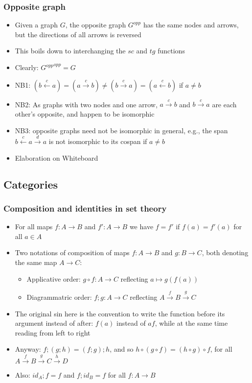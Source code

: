 \documentclass[handout]{beamer}
\begin{document}
\frame
  {   
    \frametitle{Opposite graph}\label{Ch2:oppgraph}

 \begin{itemize}[<+->]
\item Given a graph $G$, the opposite graph $G^{opp}$ has the same nodes
and arrows, but the directions of all arrows is reversed
\item This boils down to interchanging the $sc$ and $tg$ functions
\item Clearly: ${G^{opp}}^{opp} = G$
\item NB1: $(b \stackrel{c}{\leftarrow} a) = (a \stackrel{c}{\to} b) \neq  
(b \stackrel{c}{\to} a) = (a \stackrel{c}{\leftarrow} b) $
if $a\neq b$
\item NB2: As graphs with two nodes and one arrow, ${a \stackrel{c}{\to} b}$
and ${b \stackrel{c}{\to} a}$ are each other's opposite, and happen to be isomorphic
\item NB3: opposite graphs need not be isomorphic in general, e.g., the span
${b \stackrel{c}{\leftarrow} a}\stackrel{d}{\to}a$ is not isomorphic to its cospan if $a\neq b$
\item Elaboration on Whiteboard
 \end{itemize}

 }


\subsection{Categories}


\frame
  {   
    \frametitle{Composition and identities in set theory}\label{Ch2:comp-id}

 \begin{itemize}[<+->]
\item For all maps $f:A\to B$ and $f':A\to B$ we have $f=f'$ if $f(a)=f'(a)$ for all $a\in A$
\item Two notations of composition of maps $f:A\to B$ and $g: B\to C$,
both denoting the same map $A\to C$:
   \begin{itemize}[<+->]
\item Applicative order: ${g\circ f} : {A\to C}$ reflecting $a\mapsto g(f(a))$
\item Diagrammatric order: ${f;g} : A\to C$ reflecting $A\stackrel{f}{\to}B\stackrel{g}{\to}C$
   \end{itemize}
\item The original sin here is the convention to write the function before its argument
instead of after: $f(a)$ instead of $af$,
while at the same time reading from left to right
\item Anyway: $f;(g;h) = (f;g);h$, and so $h\circ(g\circ f) = (h\circ g)\circ f$,
for all $A\stackrel{f}{\to}B\stackrel{g}{\to}C\stackrel{h}{\to}D$
\item Also: $id_A ; f = f$ and $f; id_B = f$ for all $f:A\to B$
 \end{itemize}

 }
\end{document}
